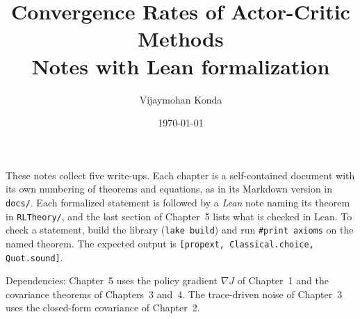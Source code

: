 \documentclass[11pt]{article}
\title{Convergence Rates of Actor-Critic Methods\\[2pt]\large Notes with Lean formalization}
\author{Vijaymohan Konda}
\date{\today}
\begin{document}
\maketitle
\thispagestyle{empty}

\noindent These notes collect five write-ups. Each chapter is a self-contained document with its
own numbering of theorems and equations, as in its Markdown version in \texttt{docs/}. Each
formalized statement is followed by a \emph{Lean} note naming its theorem in \texttt{RLTheory/},
and the last section of Chapter~5 lists what is checked in Lean. To check a statement, build the
library (\texttt{lake build}) and run \texttt{\#print axioms} on the named theorem. The expected
output is \texttt{[propext, Classical.choice, Quot.sound]}.

\medskip\noindent Dependencies: Chapter~5 uses the policy gradient $\nabla J$ of Chapter~1 and the
covariance theorems of Chapters~3 and~4. The trace-driven noise of Chapter~3 uses the closed-form
covariance of Chapter~2.

\tableofcontents
\clearpage
{}






\end{document}
